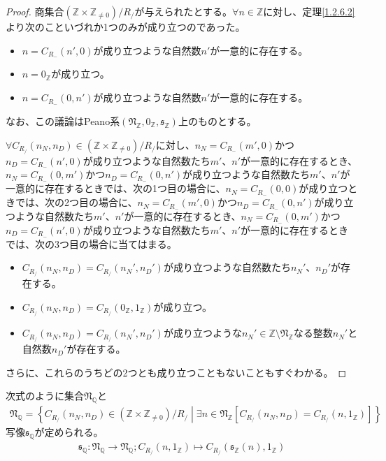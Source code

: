 \documentclass[dvipdfmx]{jsarticle}
\begin{document}
\begin{proof}
商集合$\left( \mathbb{Z} \times \mathbb{Z}_{\neq 0} \right) /R_{/} $が与えられたとする。$\forall n \in \mathbb{Z}$に対し、定理\ref{1.2.6.2}より次のこといづれか1つのみが成り立つのであった。
\begin{itemize}
\item
  $n = C_{R_{-}}\left( n',0 \right)$が成り立つような自然数$n'$が一意的に存在する。
\item
  $n = 0_{\mathbb{Z}}$が成り立つ。
\item
  $n = C_{R_{-}}\left( 0,n' \right)$が成り立つような自然数$n'$が一意的に存在する。
\end{itemize}
なお、この議論はPeano系$\left( \mathfrak{N}_{\mathbb{Z}},0_{\mathbb{Z}},\mathfrak{s}_{\mathbb{Z}} \right)$上のものとする。\par
$\forall C_{R_{/}}\left( n_{N},n_{D} \right) \in \left( \mathbb{Z} \times \mathbb{Z}_{\neq 0} \right) /R_{/} $に対し、$n_{N} = C_{R_{-}}\left( m',0 \right)$かつ$n_{D} = C_{R_{-}}\left( n',0 \right)$が成り立つような自然数たち$m'$、$n'$が一意的に存在するとき、$n_{N} = C_{R_{-}}\left( 0,m' \right)$かつ$n_{D} = C_{R_{-}}\left( 0,n' \right)$が成り立つような自然数たち$m'$、$n'$が一意的に存在するときでは、次の1つ目の場合に、$n_{N} = C_{R_{-}}(0,0)$が成り立つときでは、次の2つ目の場合に、$n_{N} = C_{R_{-}}\left( m',0 \right)$かつ$n_{D} = C_{R_{-}}\left( 0,n' \right)$が成り立つような自然数たち$m'$、$n'$が一意的に存在するとき、$n_{N} = C_{R_{-}}\left( 0,m' \right)$かつ$n_{D} = C_{R_{-}}\left( n',0 \right)$が成り立つような自然数たち$m'$、$n'$が一意的に存在するときでは、次の3つ目の場合に当てはまる。
\begin{itemize}
\item
  $C_{R_{/}}\left( n_{N},n_{D} \right) = C_{R_{/}}\left( n_{N}',n_{D}' \right)$が成り立つような自然数たち$n_{N}'$、$n_{D}'$が存在する。
\item
  $C_{R_{/}}\left( n_{N},n_{D} \right) = C_{R_{/}}\left( 0_{\mathbb{Z}},1_{\mathbb{Z}} \right)$が成り立つ。
\item
  $C_{R_{/}}\left( n_{N},n_{D} \right) = C_{R_{/}}\left( n_{N}',n_{D}' \right)$が成り立つような$n_{N}' \in \mathbb{Z} \setminus \mathfrak{N}_{\mathbb{Z}}$なる整数$n_{N}'$と自然数$n_{D}'$が存在する。
\end{itemize}
さらに、これらのうちどの2つとも成り立つこともないこともすぐわかる。
\end{proof}
\begin{dfn}
次式のように集合$\mathfrak{N}_{\mathbb{Q}}$と
\begin{align*}
\mathfrak{N}_{\mathbb{Q}} = \left\{ C_{R_{/}}\left( n_{N},n_{D} \right) \in \left( \mathbb{Z} \times \mathbb{Z}_{\neq 0} \right) /R_{/}  \middle| \exists n \in \mathfrak{N}_{\mathbb{Z}}\left[ C_{R_{/}}\left( n_{N},n_{D} \right) = C_{R_{/}}\left( n,1_{\mathbb{Z}} \right) \right] \right\}
\end{align*}
写像$\mathfrak{s}_{\mathbb{Q}}$が定められる。
\begin{align*}
\mathfrak{s}_{\mathbb{Q}}:\mathfrak{N}_{\mathbb{Q}} \rightarrow \mathfrak{N}_{\mathbb{Q}};C_{R_{/}}\left( n,1_{\mathbb{Z}} \right) \mapsto C_{R_{/}}\left( \mathfrak{s}_{\mathbb{Z}}(n),1_{\mathbb{Z}} \right)
\end{align*}
\end{dfn}
\end{document}
